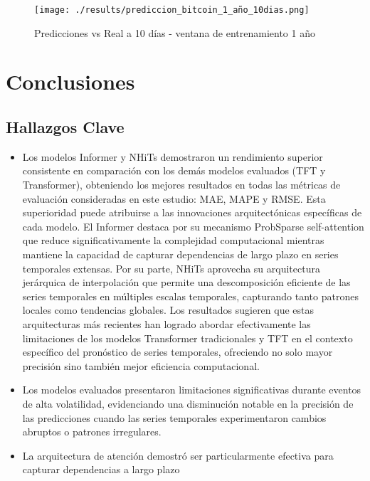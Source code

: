 \documentclass[12pt]{article}
\begin{document}
\begin{figure}[H]
\centering
\texttt{[image: ./results/prediccion\_bitcoin\_1\_año\_10dias.png]}
\caption{Predicciones vs Real a 10 días - ventana de entrenamiento 1 año}
\label{prediccion_un_anio}
\end{figure}




\newpage
\section{Conclusiones}
\label{sec:conclusiones}

\subsection{Hallazgos Clave}

\begin{itemize}
\item Los modelos Informer y NHiTs demostraron un rendimiento superior consistente en comparación con los demás modelos evaluados (TFT y Transformer), obteniendo los mejores resultados en todas las métricas de evaluación consideradas en este estudio: MAE, MAPE y RMSE.
Esta superioridad puede atribuirse a las innovaciones arquitectónicas específicas de cada modelo. El Informer destaca por su mecanismo ProbSparse self-attention que reduce significativamente la complejidad computacional mientras mantiene la capacidad de capturar dependencias de largo plazo en series temporales extensas. Por su parte, NHiTs aprovecha su arquitectura jerárquica de interpolación que permite una descomposición eficiente de las series temporales en múltiples escalas temporales, capturando tanto patrones locales como tendencias globales.
Los resultados sugieren que estas arquitecturas más recientes han logrado abordar efectivamente las limitaciones de los modelos Transformer tradicionales y TFT en el contexto específico del pronóstico de series temporales, ofreciendo no solo mayor precisión sino también mejor eficiencia computacional.
\item Los modelos evaluados presentaron limitaciones significativas durante eventos de alta volatilidad, evidenciando una disminución notable en la precisión de las predicciones cuando las series temporales experimentaron cambios abruptos o patrones irregulares.
\item La arquitectura de atención demostró ser particularmente efectiva para capturar dependencias a largo plazo
\end{itemize}
\end{document}

